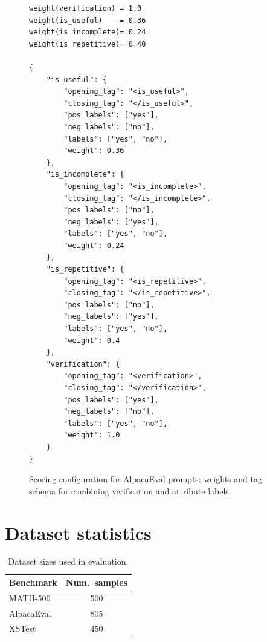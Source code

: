 \documentclass[11pt]{article}
\theoremstyle{plain}
\theoremstyle{definition}
\theoremstyle{remark}
\begin{document}
\begin{figure}[h]
\centering
\begin{minipage}{\linewidth}
\begin{small}
\begin{verbatim}
weight(verification) = 1.0
weight(is_useful)    = 0.36
weight(is_incomplete)= 0.24
weight(is_repetitive)= 0.40

{
    "is_useful": {
        "opening_tag": "<is_useful>",
        "closing_tag": "</is_useful>",
        "pos_labels": ["yes"],
        "neg_labels": ["no"],
        "labels": ["yes", "no"],
        "weight": 0.36
    },
    "is_incomplete": {
        "opening_tag": "<is_incomplete>",
        "closing_tag": "</is_incomplete>",
        "pos_labels": ["no"],
        "neg_labels": ["yes"],
        "labels": ["yes", "no"],
        "weight": 0.24
    },
    "is_repetitive": {
        "opening_tag": "<is_repetitive>",
        "closing_tag": "</is_repetitive>",
        "pos_labels": ["no"],
        "neg_labels": ["yes"],
        "labels": ["yes", "no"],
        "weight": 0.4
    },
    "verification": {
        "opening_tag": "<verification>",
        "closing_tag": "</verification>",
        "pos_labels": ["yes"],
        "neg_labels": ["no"],
        "labels": ["yes", "no"],
        "weight": 1.0
    }
}
\end{verbatim}
\end{small}
\end{minipage}
\caption{Scoring configuration for AlpacaEval prompts: weights and tag schema for combining verification and attribute labels.}
\label{fig:appendix-qwen-alpaca-config}
\end{figure}

\section{Dataset statistics}
\begin{table}[h]
\centering
\begin{small}
\begin{sc}
\begin{tabular}{lc}
\toprule
\textbf{Benchmark} & \textbf{Num.\ samples} \\
\midrule
MATH-500 & 500 \\
AlpacaEval & 805 \\
XSTest & 450 \\
\bottomrule
\end{tabular}
\end{sc}
\end{small}
\caption{Dataset sizes used in evaluation.}
\label{tab:appendix-dataset-stats}
\end{table}
\end{document}
